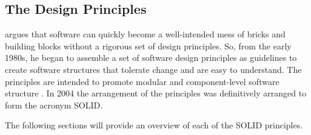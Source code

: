 \subsection{The Design Principles} \label{subsec_design_principles}

\textcite[78]{robert_c_martin_clean_2018} argues that software can quickly become a
well-intended mess of bricks and building blocks without a rigorous set of design
principles. So, from the early 1980s, he began to assemble a set of software design
principles as guidelines to create software structures that tolerate change and are easy
to understand. The principles are intended to promote modular and component-level software
structure \parencite[79]{robert_c_martin_clean_2018}. In 2004 the arrangement of the
principles was definitively arranged to form the acronym SOLID. 

The following sections will provide an overview of each of the SOLID principles.





